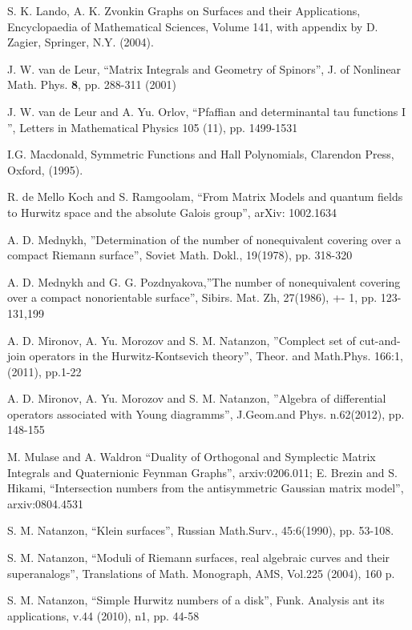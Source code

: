 \documentclass[a4paper,10pt]{article}
\theoremstyle{plain}
\theoremstyle{remark}
\begin{document}
\begin{thebibliography}{99}
 
 S. K. Lando, A. K. Zvonkin { Graphs on Surfaces and their Applications}, Encyclopaedia of Mathematical Sciences,
 Volume 141, with  appendix by D. Zagier, Springer, N.Y. (2004).


 J. W. van de Leur, ``Matrix Integrals and Geometry of
Spinors'', { J. of Nonlinear Math. Phys.} {\bf  8},  pp. 288-311
(2001)

 J. W. van de Leur and A. Yu. Orlov,
``Pfaffian and determinantal tau functions I '',  Letters in Mathematical Physics 105 (11), pp. 1499-1531

 
 I.G. Macdonald, {Symmetric Functions and Hall Polynomials},
Clarendon Press, Oxford, (1995).

 
 R. de Mello Koch and S. Ramgoolam, ``From Matrix Models and quantum fields
to Hurwitz space and the absolute Galois group'', arXiv: 1002.1634

 
 A. D. Mednykh, ''Determination of the number of nonequivalent covering over a compact Riemann surface'',
Soviet Math. Dokl., 19(1978), pp. 318-320

 A. D. Mednykh and G. G. Pozdnyakova,''The number of nonequivalent covering over a compact nonorientable
surface'', Sibirs. Mat. Zh, 27(1986), +- 1, pp. 123-131,199


 A. D. Mironov, A. Yu. Morozov and S. M. Natanzon, ''Complect set of cut-and-join operators in the
Hurwitz-Kontsevich theory'', Theor. and Math.Phys. 166:1,(2011), pp.1-22

 A. D. Mironov, A. Yu. Morozov and S. M. Natanzon,
''Algebra of differential operators associated with Young diagramms'', J.Geom.and Phys. n.62(2012), pp. 148-155


 M. Mulase and A. Waldron ``Duality of Orthogonal and Symplectic Matrix
Integrals and Quaternionic Feynman Graphs'', arxiv:0206.011; E. Brezin and S. Hikami,
``Intersection numbers from the antisymmetric
Gaussian matrix model'', arxiv:0804.4531


 S. M. Natanzon, ``Klein surfaces'', Russian Math.Surv., 45:6(1990), pp. 53-108.

 S. M. Natanzon, ``Moduli of Riemann surfaces, real algebraic curves and their superanalogs'',
Translations of Math. Monograph, AMS, Vol.225 (2004), 160 p.

 S. M. Natanzon, ``Simple Hurwitz numbers of a disk'', Funk. Analysis ant its applications, v.44 (2010), n1, pp. 44-58


\end{thebibliography}
\end{document}
